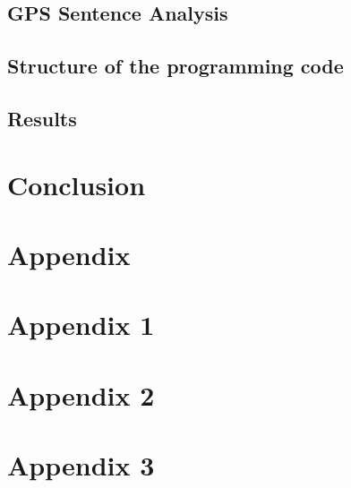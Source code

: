 \documentclass[12pt,fleqn]{report} %
\begin{document}
\section{GPS Sentence Analysis}

\section{Structure of the programming code}

\section{Results}


\chapter*{Conclusion}


\appendix
\chapter*{Appendix}
\chapter{Appendix 1}
\chapter{Appendix 2}
\chapter{Appendix 3}

%


\nocite{*}

\end{document}
